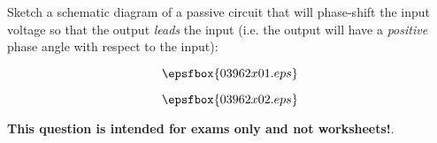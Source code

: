 

Sketch a schematic diagram of a passive circuit that will phase-shift the input voltage so that the output {\it leads} the input (i.e. the output will have a {\it positive} phase angle with respect to the input):

$$\epsfbox{03962x01.eps}$$







$$\epsfbox{03962x02.eps}$$







{\bf This question is intended for exams only and not worksheets!}.



